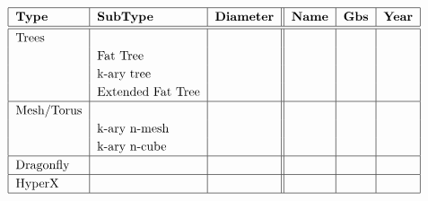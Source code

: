 \begin{table}
\begin{center}
\[\arraycolsep=0.pt\def\arraystretch{1.2}
\begin{tabular}{| l | l | l || l | l | l | }
\hline
\textbf{Type} & \textbf{SubType} & \textbf{Diameter} & \textbf{Name} & \textbf{Gbs} & \textbf{Year} \\
\hline
\hline
Trees & & & & & \\
& Fat Tree & & & & \\
& k-ary tree & & & & \\
& Extended Fat Tree & & & &\\
\hline
Mesh/Torus & & & & & \\
& k-ary n-mesh & & & & \\
& k-ary n-cube & & & & \\
\hline
Dragonfly & & & & & \\
\hline
HyperX & & & & &  \\
\hline
\end{tabular}
\]
\caption{InfiniBand technologies}
\label{fig:1_HPC:topology}
\end{center}
\end{table}

